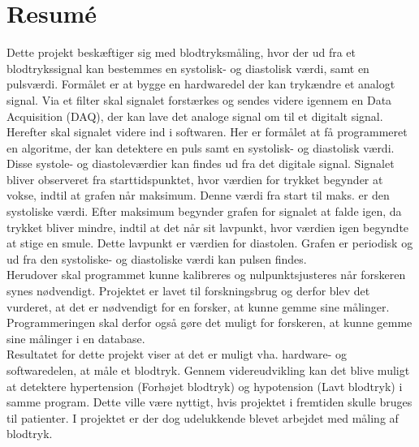 \chapter{Resumé}
Dette projekt beskæftiger sig med blodtryksmåling, hvor der ud fra et blodtrykssignal kan bestemmes en systolisk- og diastolisk værdi, samt en pulsværdi. Formålet er at bygge en hardwaredel der kan trykændre et analogt signal. Via et filter skal signalet forstærkes og sendes videre igennem en Data Acquisition (DAQ), der kan lave det analoge signal om til et digitalt signal. Herefter skal signalet videre ind i softwaren. Her er formålet at få programmeret en algoritme, der kan detektere en puls samt en systolisk- og diastolisk værdi. Disse systole- og diastoleværdier kan findes ud fra det digitale signal. Signalet bliver observeret fra starttidspunktet, hvor værdien for trykket begynder at vokse, indtil at grafen når maksimum. Denne værdi fra start til maks. er den systoliske værdi. Efter maksimum begynder grafen for signalet at falde igen, da trykket bliver mindre, indtil at det når sit lavpunkt, hvor værdien igen begyndte at stige en smule. Dette lavpunkt er værdien for diastolen. Grafen er periodisk og ud fra den systoliske- og diastoliske værdi kan pulsen findes. \\
Herudover skal programmet kunne kalibreres og nulpunktsjusteres når forskeren synes nødvendigt. Projektet er lavet til forskningsbrug og derfor blev det vurderet, at det er nødvendigt for en forsker, at kunne gemme sine målinger. Programmeringen skal derfor også gøre det muligt for forskeren, at kunne gemme sine målinger i en database.  \\
Resultatet for dette projekt viser at det er muligt vha. hardware- og softwaredelen, at måle et blodtryk. Gennem videreudvikling kan det blive muligt at detektere hypertension (Forhøjet blodtryk) og hypotension (Lavt blodtryk) i samme program. Dette ville være nyttigt, hvis projektet i fremtiden skulle bruges til patienter. I projektet er der dog udelukkende blevet arbejdet med måling af blodtryk.
